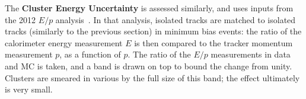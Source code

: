 	The \textbf{Cluster Energy Uncertainty} is assessed similarly, and uses inputs from the 2012 $E/p$ analysis~\cite{ATL-PHYS-PUB-2014-002}. In that analysis, isolated tracks are matched to isolated tracks (similarly to the previous section) in minimum bias events: the ratio of the calorimeter energy measurement $E$ is then compared to the tracker momentum measurement $p$, as a function of $p$. The ratio of the $E/p$ measurements in data and MC is taken, and a band is drawn on top to bound the change from unity. 	Clusters are smeared in various by the full size of this band; the effect ultimately is very small.






